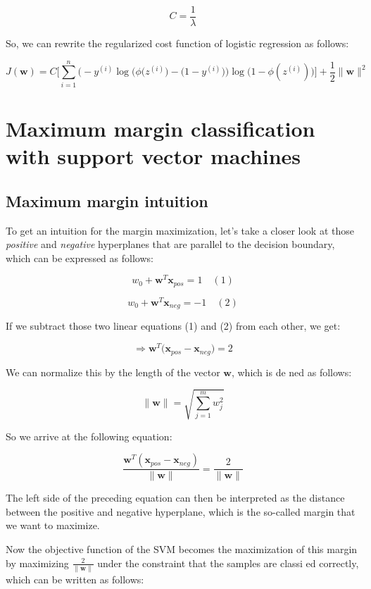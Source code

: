 \documentclass[letterpaper]{report}
\begin{document}
\[
C = \frac{1}{\lambda}
\]

So, we can rewrite the regularized cost function of logistic regression as follows:

\[
J(\mathbf{w}) = C \Bigg[  \sum_{i=1}^{n} \Big(   -y^{(i)} \log \big( \phi(z^{(i)} \big) - \big(  1 - y^{(i)} \big)    \Big) \log \bigg( 1 - \phi(z^{(i)}) \bigg)         \Bigg] + \frac{1}{2} \lVert \mathbf{w} \rVert^2
\]




\section{Maximum margin classification with support vector machines}

\subsection{Maximum margin intuition}

To get an intuition for the margin maximization, let's take a closer look at those \textit{positive} and \textit{negative} hyperplanes that are parallel to the decision boundary, which can be expressed as follows:

\[
w_0 + \mathbf{w}^T \mathbf{x}_{pos} = 1 \quad (1)
\]

\[
w_0 + \mathbf{w}^T \mathbf{x}_{neg} = -1 \quad (2)
\]

If we subtract those two linear equations (1) and (2) from each other, we get:

\[
\Rightarrow \mathbf{w}^T \big(  \mathbf{x}_{pos} - \mathbf{x}_{neg} \big) = 2
\]

We can normalize this by the length of the vector $\mathbf{w}$, which is de ned as follows:

\[
\lVert \mathbf{w} \rVert = \sqrt{\sum_{j=1}^{m} w_{j}^{2}} 
\]

So we arrive at the following equation:

\[
\frac{\mathbf{w}^T ( \mathbf{x}_{pos} - \mathbf{x}_{neg}  )}{\lVert \mathbf{w} \rVert} = \frac{2}{\lVert \mathbf{w} \rVert}
\]

The left side of the preceding equation can then be interpreted as the distance between the positive and negative hyperplane, which is the so-called margin that we want to maximize.

Now the objective function of the SVM becomes the maximization of this margin by maximizing $\frac{2}{\lVert \mathbf{w} \rVert}$ under the constraint that the samples are classi ed correctly, which can be written as follows:
\end{document}
